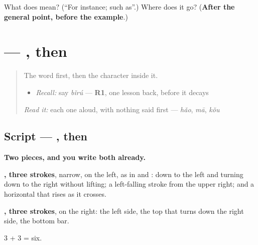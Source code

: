 \begin{tcolorbox}[breakable,colback=teal!4,colframe=teal!35!black,title={Before you move on}]
What does  mean? (\textquotedblleft{}For instance; such as\textquotedblright{}.) Where does it go? (\textbf{After the general point, before the example}.)
\end{tcolorbox}
\section[\texorpdfstring{\zh{如} (rú)}{如 (rú)}]{ — , then }

\label{lesson:ZH-W281-ru}



\begin{quote}
The word first, then the character inside it.

\begin{itemize}
\raggedright
  \item \emph{Recall:} say \emph{bǐrú} — \textbf{R1}, one lesson back, before it decays
\end{itemize}

\begin{quote}
  
\end{quote}

\emph{Read it:} each one aloud, with nothing said first — \emph{hǎo}, \emph{mā}, \emph{kǒu}
\end{quote}

\subsection*{Script — , then }

\begin{quote}
\end{quote}

\textbf{Two pieces, and you write both already.}

\textbf{, three strokes}, narrow, on the left, as in  and : down to the left and turning down to the right without lifting; a left-falling stroke from the upper right; and a horizontal that rises as it crosses.

\textbf{, three strokes}, on the right: the left side, the top that turns down the right side, the bottom bar.

3 + 3 = six.

